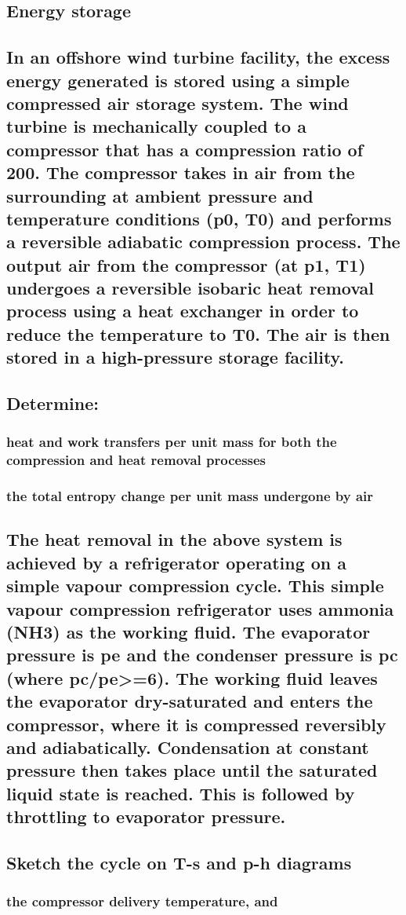 \documentclass[12pt]{article}
\numberwithin{equation}{section}
\begin{document}
\begin{flushleft}
\section{Energy storage}
\subsection{In an offshore wind turbine facility, the excess energy generated is stored using a simple compressed air storage system. The wind turbine is mechanically coupled to a compressor that has a compression ratio of 200. The compressor takes in air from the surrounding at ambient pressure and temperature conditions (p0, T0) and performs a reversible adiabatic compression process. The output air from the compressor (at p1, T1) undergoes a reversible isobaric heat removal process using a heat exchanger in order to reduce the temperature to T0. The air is then stored in a high-pressure storage facility.}
\subsection{Determine:}
\subsubsection{heat and work transfers per unit mass for both the compression and heat removal processes}
\subsubsection{the total entropy change per unit mass undergone by air}
\subsection{The heat removal in the above system is achieved by a refrigerator operating on a simple vapour compression cycle. This simple vapour compression refrigerator uses ammonia (NH3) as the working fluid. The evaporator pressure is pe and the condenser pressure is pc (where pc/pe>=6). The working fluid leaves the evaporator dry-saturated and enters the compressor, where it is compressed reversibly and adiabatically. Condensation at constant pressure then takes place until the saturated liquid state is reached. This is followed by throttling to evaporator pressure.}
\subsection{Sketch the cycle on T-s and p-h diagrams}
\subsubsection{the compressor delivery temperature, and}

\end{flushleft}
\end{document}
